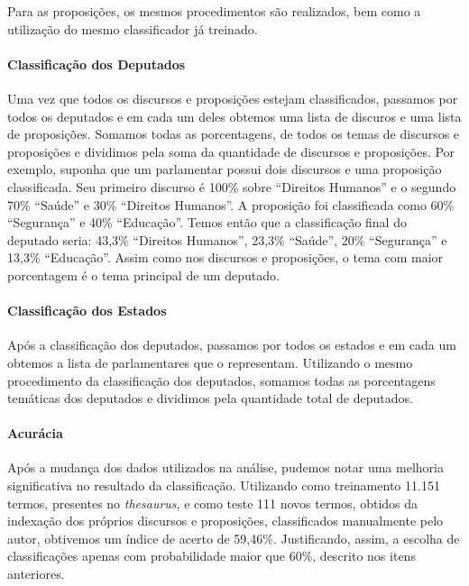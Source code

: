 Para as proposições, os mesmos procedimentos são realizados, bem como a utilização do mesmo classificador já treinado.

\paragraph{Classificação dos Deputados}

Uma vez que todos os discursos e proposições estejam classificados, passamos por todos os deputados e em cada um deles obtemos uma lista de discuros e uma lista de proposições. Somamos todas as porcentagens, de todos os temas de discursos e proposições e dividimos pela soma da quantidade de discursos e proposições. Por exemplo, suponha que um parlamentar possui dois discursos e uma proposição classificada. Seu primeiro discurso é 100\% sobre ``Direitos Humanos'' e o segundo 70\% ``Saúde'' e 30\% ``Direitos Humanos''. A proposição foi classificada como 60\% ``Segurança'' e 40\% ``Educação''. Temos então que a classificação final do deputado seria: 43,3\% ``Direitos Humanos'', 23,3\% ``Saúde'', 20\% ``Segurança'' e 13,3\% ``Educação''. Assim como nos discursos e proposições, o tema com maior porcentagem é o tema principal de um deputado.

\paragraph{Classificação dos Estados}

Após a classificação dos deputados, passamos por todos os estados e em cada um obtemos a lista de parlamentares que o representam. Utilizando o mesmo procedimento da classificação dos deputados, somamos todas as porcentagens temáticas dos deputados e dividimos pela quantidade total de deputados.

\paragraph{Acurácia}

Após a mudança dos dados utilizados na análise, pudemos notar uma melhoria significativa no resultado da classificação. Utilizando como treinamento 11.151 termos, presentes no \textit{thesaurus}, e como teste 111 novos termos, obtidos da indexação dos próprios discursos e proposições, classificados manualmente pelo autor, obtivemos um índice de acerto de 59,46\%. Justificando, assim, a escolha de classificações apenas com probabilidade maior que 60\%, descrito nos itens anteriores.
